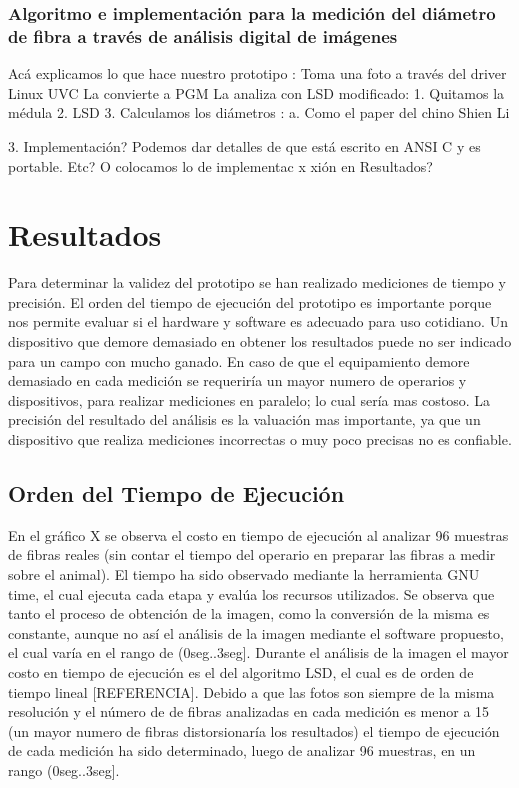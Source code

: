 \documentclass[runningheads,a4paper]{llncs}
\begin{document}
	

\subsubsection{Algoritmo e implementación para la medición del diámetro de fibra a través de análisis digital de imágenes}

Acá explicamos lo que hace nuestro prototipo :
Toma una foto a través del driver Linux UVC
La convierte a PGM
La analiza con LSD modificado:
1. Quitamos la médula
2. LSD
3. Calculamos los diámetros :
a. Como el paper del chino Shien Li

3. Implementación?
Podemos dar detalles de que está escrito en ANSI C y es portable. Etc? O colocamos lo de implementac               x xión en Resultados?

\section{Resultados}

Para determinar la validez del prototipo se han realizado mediciones de tiempo y precisión.
El orden del tiempo de ejecución del prototipo es importante porque nos permite evaluar si el hardware y software es adecuado para uso cotidiano. Un dispositivo que demore demasiado en obtener los resultados puede no ser indicado para un campo con mucho ganado. En caso de que el equipamiento demore demasiado en cada medición se requeriría un mayor numero de operarios y dispositivos, para realizar mediciones en paralelo; lo cual sería mas costoso.
La precisión del resultado del análisis es la valuación mas importante, ya que un dispositivo que realiza mediciones incorrectas o muy poco precisas no es confiable.


\subsection{Orden del Tiempo de Ejecución}
En el gráfico X se observa el costo en tiempo de ejecución al analizar 96 muestras de fibras reales (sin contar el tiempo del operario en preparar las fibras a medir sobre el animal). El tiempo ha sido observado mediante la herramienta GNU time, el cual ejecuta cada etapa y evalúa los recursos utilizados. Se observa que tanto el proceso de obtención de la imagen, como la conversión de la misma es constante, aunque no así el análisis de la imagen mediante el software propuesto, el cual varía en el rango de (0seg..3seg].
Durante el análisis de la imagen el mayor costo en tiempo de ejecución es el del algoritmo LSD, el cual es de orden de tiempo lineal [REFERENCIA]. Debido a que las fotos son siempre de la misma resolución y el número de de fibras analizadas en cada medición es menor a 15 (un mayor numero de fibras distorsionaría los resultados) el tiempo de ejecución de cada medición ha sido determinado, luego de analizar 96 muestras, en un rango (0seg..3seg].
\end{document}
